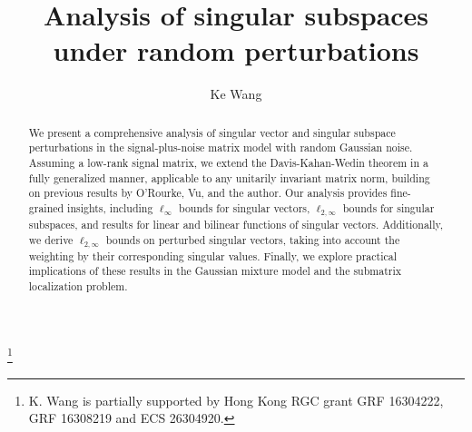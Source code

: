 \documentclass[reqno]{amsart}
\theoremstyle{plain}
\theoremstyle{definition}
\begin{document}
\title{Analysis of singular subspaces under random perturbations}

\author{Ke Wang}
\thanks{K. Wang is partially supported by Hong Kong RGC grant GRF 16304222, GRF 16308219 and ECS 26304920.}
\address{Department of Mathematics, Hong Kong University of Science and Technology, Hong Kong}

\begin{abstract}
We present a comprehensive analysis of singular vector and singular subspace perturbations in the signal-plus-noise matrix model with random Gaussian noise. Assuming a low-rank signal matrix, we extend the Davis-Kahan-Wedin theorem in a fully generalized manner, applicable to any unitarily invariant matrix norm, building on previous results by O'Rourke, Vu, and the author. Our analysis provides fine-grained insights, including $\ell_\infty$ bounds for singular vectors,  $\ell_{2, \infty}$ bounds for singular subspaces,  and results for linear and bilinear functions of singular vectors. Additionally, we derive $\ell_{2,\infty}$ bounds on perturbed singular vectors, taking into account the weighting by their corresponding singular values. Finally, we explore practical implications of these results in the Gaussian mixture model and the submatrix localization problem. 
\end{abstract}




\maketitle
\end{document}
